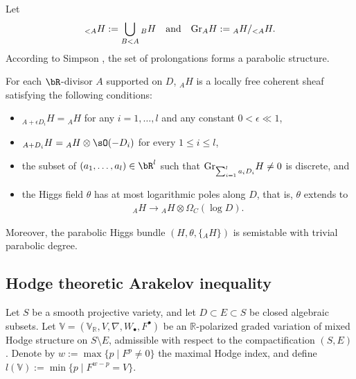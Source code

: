 \documentclass[11pt,letterpaper]{amsart}
\numberwithin{equation}{section}
\begin{document}
Let
\begin{align*}
	{_{<A}}H:=\bigcup_{{B}<{A}}{_{B}}H\quad\textrm{and}\quad{\rm Gr}_{A}H:={_{A}}H/{_{<A}}H.
\end{align*}	
According to Simpson \cite[Theorem 3, Theorem 5]{Simpson1990}, the set of prolongations forms a parabolic structure.
\begin{thm}\label{thm_parabolic}
	For each $\bR$-divisor $A$ supported on $D$, $_{A}H$ is a locally free coherent sheaf satisfying the following conditions:
	\begin{itemize}
		\item  $_{A+\epsilon D_i}H = {_A}H$ for any $i=1,\dots,l$ and any constant $0<\epsilon\ll 1$,
		\item $_{A+D_i}H={_A}H\otimes \sO(-D_i)$ for every $1\leq i\leq l$,
		\item the subset of $(a_1,\dots,a_l)\in\bR^l$ such that ${\rm Gr}_{\sum_{i=1}^l a_iD_i}H\neq 0$ is discrete, and
		\item the Higgs field $\theta$ has at most logarithmic poles along $D$, that is, $\theta$ extends to 
		\begin{align*}
			{_{A}}H\to{_{A}}H\otimes\Omega_{C}(\log D).
		\end{align*}
	\end{itemize} 
    Moreover, the parabolic Higgs bundle $(H,\theta,\{{_A}H\})$ is semistable with trivial parabolic degree.
\end{thm}
\subsection{Hodge theoretic Arakelov inequality}\label{section_Hodge_Arakelov}
Let $S$ be a smooth projective variety, and let $D \subset E \subset S$ be closed algebraic subsets. Let $\mathbb{V} = (\mathbb{V}_\mathbb{R}, V, \nabla, W_\bullet, F^\bullet)$ be an $\mathbb{R}$-polarized graded variation of mixed Hodge structure on $S \setminus E$, admissible with respect to the compactification $(S, E)$. Denote by $w := \max\{p \mid F^p \neq 0\}$ the maximal Hodge index, and define $l(\mathbb{V}) := \min\{p \mid F^{w-p} = V\}$.
\end{document}

